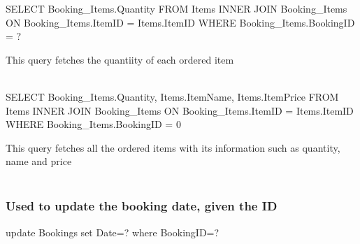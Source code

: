 \begin{sql}
SELECT
 Booking_Items.Quantity
 FROM Items
 INNER JOIN Booking_Items
 ON Booking_Items.ItemID = Items.ItemID
 WHERE Booking_Items.BookingID = ? 
\end{sql}
This query fetches the quantiity of each ordered item \\ \\

\begin{sql}
SELECT
 Booking_Items.Quantity,
 Items.ItemName,
 Items.ItemPrice
 FROM Items
 INNER JOIN Booking_Items
 ON Booking_Items.ItemID = Items.ItemID
 WHERE Booking_Items.BookingID = {0}
\end{sql}
This query fetches all the ordered items with its information such as quantity, name and price \\ \\

\subsubsection{Used to update the booking date, given the ID}
\begin{sql}
update Bookings set Date=? where BookingID=?
\end{sql}

